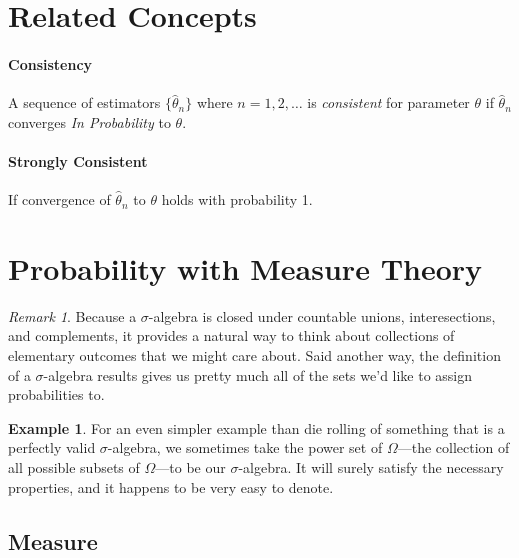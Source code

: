 \documentclass[12pt]{article}
\theoremstyle{plain}
\theoremstyle{definition}
\newtheorem{ex}[thm]{Example}
\theoremstyle{remark}
\newtheorem*{rmk}{Remark}
\begin{document}



\section{Related Concepts}

\paragraph{Consistency} A sequence of estimators $\{ \hat{\theta}_n \}$
where $n=1,2,\ldots$ is \emph{consistent} for parameter $\theta$ if
$\hat{\theta}_n$ converges \emph{In Probability} to $\theta$.

\paragraph{Strongly Consistent} If convergence of $\hat{\theta}_n$
to $\theta$ holds with probability 1.



\section{Probability with Measure Theory}


\begin{rmk}
Because a $\sigma$-algebra is closed under countable unions,
interesections, and complements, it provides a natural way to think
about collections of elementary outcomes that we might care about. Said
another way, the definition of a $\sigma$-algebra results gives us
pretty much all of the sets we'd like to assign probabilities to.
\end{rmk}

\begin{ex}
For an even simpler example than die rolling of something that is
a perfectly valid $\sigma$-algebra, we
sometimes take the power set of $\Omega$---the collection of all
possible subsets of $\Omega$---to be our $\sigma$-algebra.  It will
surely satisfy the necessary properties, and it happens to be very easy
to denote.
\end{ex}


\subsection{Measure}
\end{document}
